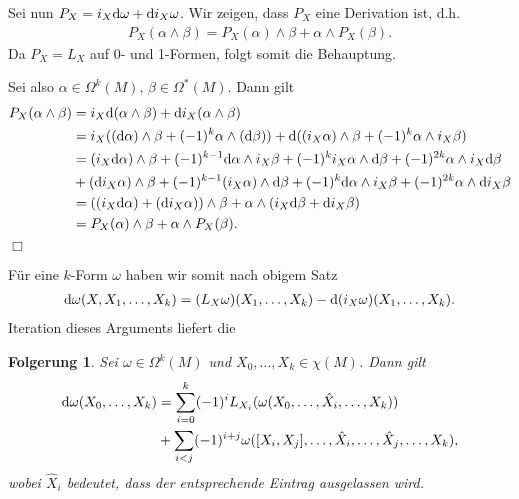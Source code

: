 \documentclass[12pt,a4paper]{article}
\newtheorem{Folgerung}[Lemma]{Folgerung}
\def\qed{\quad\hfill\ensuremath{\Box}}
\begin{document}
Sei nun $P_X = i_X\mathrm{d}\omega + \mathrm{d} i_X\omega$. Wir zeigen, dass $P_X$ eine
Derivation ist, d.h.
\begin{align*}
P_X(\alpha\wedge \beta) = P_X(\alpha)\wedge \beta + \alpha\wedge P_X(\beta).
\end{align*}
Da $P_X = L_X$ auf $0$- und 1-Formen, folgt somit die Behauptung.

\medskip

Sei also $\alpha\in\Omega^k(M)$, $\beta\in\Omega^*(M)$. Dann gilt
\begin{align*}
P_X(\alpha\wedge\beta) &= i_X\mathrm{d}(\alpha\wedge\beta) + \mathrm{d}
i_X(\alpha\wedge\beta) \\ &=  
i_X((\mathrm{d}\alpha)\wedge\beta + (-1)^k \alpha\wedge(\mathrm{d}\beta))
+ \mathrm{d}( (i_X\alpha)\wedge\beta + (-1)^k\alpha\wedge i_X\beta )\\
&= (i_X\mathrm{d}\alpha)\wedge \beta + 
(-1)^{k-1} \mathrm{d}\alpha\wedge i_X\beta
+ (-1)^ki_X\alpha\wedge\mathrm{d}\beta + (-1)^{2k}\alpha\wedge i_X\mathrm{d}\beta\\
&+ (\mathrm{d} i_X\alpha)\wedge \beta + (-1)^{k-1} (i_X\alpha) \wedge \mathrm{d}\beta
+ (-1)^k\mathrm{d}\alpha\wedge i_X\beta + (-1)^{2k} \alpha\wedge \mathrm{d} i_X\beta\\
&= ((i_X\mathrm{d}\alpha)+ (\mathrm{d} i_X\alpha))\wedge \beta + 
\alpha\wedge (i_X\mathrm{d}\beta +  \mathrm{d} i_X\beta)\\
&= P_X(\alpha)\wedge\beta + \alpha\wedge P_X(\beta).
\end{align*}
\qed

\bigskip

F\"ur eine $k$-Form $\omega$ haben wir somit nach obigem Satz
\begin{align*}
\mathrm{d}\omega(X,X_1,\ldots,X_k) = (L_X\omega)(X_1,\ldots,X_k) -
\mathrm{d}(i_X\omega)(X_1,\ldots,X_k).
\end{align*}
Iteration dieses Arguments liefert die

\begin{Folgerung}
Sei $\omega\in\Omega^{k}(M)$ und $X_0,\ldots,X_k\in\chi(M)$. Dann gilt
\begin{align*}
\mathrm{d}\omega(X_0,\ldots,X_k) &= \sum_{i=0}^k (-1)^i
L_{X_i}(\omega(X_0,\ldots,\hat{X}_i,\ldots,X_k))\\
&+ \sum_{i<j} (-1)^{i+j}
\omega([X_i,X_j],\ldots,\hat{X}_i,\ldots,\hat{X}_j,\ldots,X_k),
\end{align*}
wobei $\hat{X}_i$ bedeutet, dass der entsprechende Eintrag ausgelassen wird.
\end{Folgerung}

\bigskip
\end{document}
